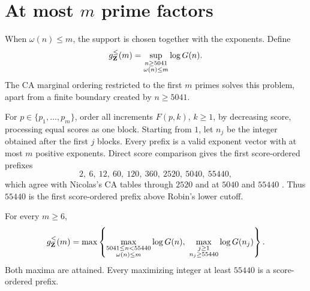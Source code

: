 \section{At most \texorpdfstring{\(m\)}{m} prime factors}
\label{s-bounded-support}

When \(\omega(n)\leq m\), the support is chosen together with the
exponents. Define
\[
    g_{\mathbf{Z}}^{\leq}(m)
    =
    \sup_{\substack{n\geq5041\\ \omega(n)\leq m}}
    \log G(n).
\]
The CA marginal ordering restricted to the first \(m\) primes solves this
problem, apart from a finite boundary created by \(n\geq5041\).

For \(p\in\{p_1,\ldots,p_m\}\), order all increments \(F(p,k)\),
\(k\geq1\), by decreasing score, processing equal scores as one block.
Starting from \(1\), let \(n_j\) be the integer obtained after the first
\(j\) blocks. Every prefix is a valid exponent vector with at
most \(m\) positive exponents. Direct score comparison gives the first
score-ordered prefixes
\[
    2,\ 6,\ 12,\ 60,\ 120,\ 360,\ 2520,\ 5040,\ 55440,
\]
which agree with Nicolas's CA tables through \(2520\) and at \(5040\) and
\(55440\) \cite[Tables~1--2]{nicolas-2022-sigma}. Thus \(55440\) is the
first score-ordered prefix above Robin's lower cutoff.

\begin{theorem}
\label{thm-bounded-support-prefix}
For every \(m\geq6\),
\begin{equation}
\label{e-bounded-support-prefix}
    g_{\integers}^{\leq}(m)
    =
    \max\left\{
        \max_{\substack{5041\leq n<55440\\ \omega(n)\leq m}}
        \log G(n),
        \ 
        \max_{\substack{j\geq1\\ n_j\geq55440}}
        \log G(n_j)
    \right\}.
\end{equation}
Both maxima are attained. Every maximizing integer at least \(55440\)
is a score-ordered prefix.
\end{theorem}


